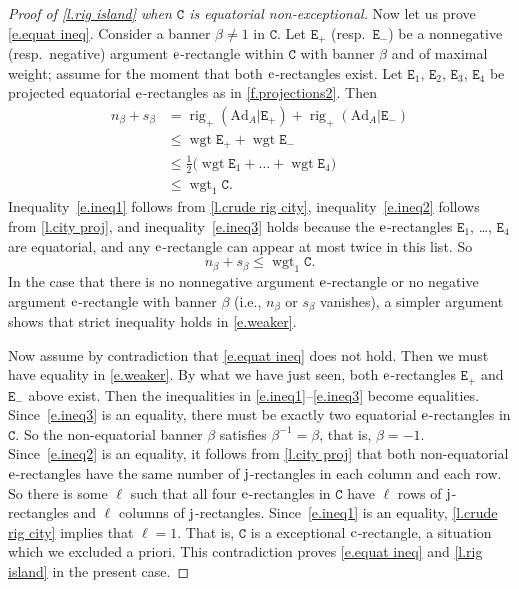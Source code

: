 \documentclass[10pt, a4paper]{amsart}
\theoremstyle{plain}
\theoremstyle{definition}
\theoremstyle{remark}
\theoremstyle{note}
\numberwithin{equation}{section}
\begin{document}
\begin{proof}[Proof of \cref{l.rig island} when ${\mathtt{C}}$ is equatorial non-exceptional]
Now let us prove \eqref{e.equat ineq}.
Consider a banner $\beta \neq 1$ in ${\mathtt{C}}$.
Let ${\mathtt{E}}_+$ (resp.\ ${\mathtt{E}}_-$) be a nonnegative (resp.\ negative) argument $\rm e$-rectangle within ${\mathtt{C}}$ with banner $\beta$ 
and of maximal weight;
assume for the moment that both $\rm e$-rectangles exist.
Let ${\mathtt{E}}_1$, ${\mathtt{E}}_2$, ${\mathtt{E}}_3$, ${\mathtt{E}}_4$ be projected equatorial $\rm e$-rectangles as in \cref{f.projections2}.
Then
\begin{align}
n_\beta + s_\beta  
&= \operatorname{rig}_+({\mathrm{Ad}}_A | {\mathtt{E}}_+) + \operatorname{rig}_+({\mathrm{Ad}}_A | {\mathtt{E}}_-)                \nonumber \\
&\le \operatorname{wgt} {\mathtt{E}}_+ + \operatorname{wgt} {\mathtt{E}}_-                                   \label{e.ineq1}\\
&\le  \tfrac{1}{2}\big( \operatorname{wgt} {\mathtt{E}}_1 + \dots + \operatorname{wgt} {\mathtt{E}}_4 \big)   \label{e.ineq2}\\
&\le \operatorname{wgt}_1 {\mathtt{C}}.                                                \label{e.ineq3}
\end{align}
Inequality~\eqref{e.ineq1} follows from \cref{l.crude rig city}, 
inequality~\eqref{e.ineq2} follows from \cref{l.city proj}, and
inequality~\eqref{e.ineq3} holds because the $\rm e$-rectangles ${\mathtt{E}}_1$, \dots, ${\mathtt{E}}_4$ are equatorial,
and any $\rm e$-rectangle can appear at most twice in this list.
So 
\begin{equation}\label{e.weaker}
n_\beta + s_\beta \le \operatorname{wgt}_1 {\mathtt{C}}.
\end{equation}
In the case that there is no nonnegative argument $\rm e$-rectangle or no negative argument $\rm e$-rectangle with banner $\beta$ 
(i.e., $n_\beta$ or $s_\beta$ vanishes),
a simpler argument shows that strict inequality holds in \eqref{e.weaker}.

Now assume by contradiction that \eqref{e.equat ineq} does not hold.
Then we must have equality in \eqref{e.weaker}.
By what we have just seen, both $\rm e$-rectangles ${\mathtt{E}}_+$ and ${\mathtt{E}}_-$ above exist.
Then the inequalities in \eqref{e.ineq1}--\eqref{e.ineq3} become equalities.
Since~\eqref{e.ineq3} is an equality, there must be exactly two equatorial $\rm e$-rectangles in ${\mathtt{C}}$.
So the non-equatorial banner $\beta$ satisfies $\beta^{-1} = \beta$, that is, $\beta=-1$.
Since~\eqref{e.ineq2} is an equality, it follows from \cref{l.city proj} that both non-equatorial $\rm e$-rectangles 
have the same number of $\rm j$-rectangles in each column and each row.
So there is some $\ell$ such that all four $\rm e$-rectangles in ${\mathtt{C}}$ have $\ell$ rows of $\rm j$-rectangles 
and $\ell$ columns of $\rm j$-rectangles.
Since~\eqref{e.ineq1} is an equality, \cref{l.crude rig city} implies that $\ell=1$.
That is, ${\mathtt{C}}$ is a exceptional $\rm c$-rectangle, a situation which we excluded a priori.
This contradiction proves \eqref{e.equat ineq} and \cref{l.rig island}
in the present case.
\end{proof}
\end{document}
